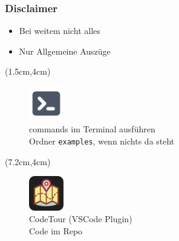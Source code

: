 \documentclass[22pt]{beamer}
\newcommand{\code}[1]{\colorbox{gray!10}{\texttt{#1}}}
\begin{document}
\begin{frame}[t]
    \frametitle{Disclaimer}
    \begin{itemize}
        \item Bei weitem nicht alles
        \item Nur Allgemeine Auszüge 
    \end{itemize}

    \begin{textblock*}{4.5cm}(1.5cm,4cm) %
        \begin{figure}
            \includegraphics[width=1.5cm]{Bilder/terminal.png}
            \captionsetup{justification=centering}
            \caption*{commands im Terminal ausführen\\ Ordner \code{examples}, wenn nichts da steht}
        \end{figure}

    \end{textblock*}

    \begin{textblock*}{4.5cm}(7.2cm,4cm) %
        \begin{figure}
            \includegraphics[width=1.5cm]{Bilder/CodeTour.png}
            \centering
            \captionsetup{justification=centering}
            \caption*{CodeTour (VSCode Plugin)\\Code im Repo}
        \end{figure}
    
    \end{textblock*}



\end{frame}
\end{document}
